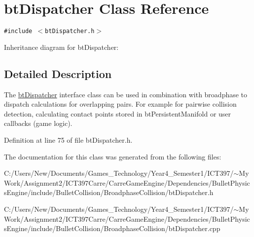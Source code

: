 \hypertarget{classbt_dispatcher}{
\section{btDispatcher Class Reference}
\label{classbt_dispatcher}
}
{\tt \#include $<$btDispatcher.h$>$}

Inheritance diagram for btDispatcher:

\subsection{Detailed Description}
The \hyperlink{classbt_dispatcher}{btDispatcher} interface class can be used in combination with broadphase to dispatch calculations for overlapping pairs. For example for pairwise collision detection, calculating contact points stored in btPersistentManifold or user callbacks (game logic). 

Definition at line 75 of file btDispatcher.h.

The documentation for this class was generated from the following files:\begin{CompactItemize}
\item 
C:/Users/New/Documents/Games\_\-Technology/Year4\_\-Semester1/ICT397/$\sim$My Work/Assignment2/ICT397Carre/CarreGameEngine/Dependencies/BulletPhysicsEngine/include/BulletCollision/BroadphaseCollision/btDispatcher.h\item 
C:/Users/New/Documents/Games\_\-Technology/Year4\_\-Semester1/ICT397/$\sim$My Work/Assignment2/ICT397Carre/CarreGameEngine/Dependencies/BulletPhysicsEngine/include/BulletCollision/BroadphaseCollision/btDispatcher.cpp\end{CompactItemize}
